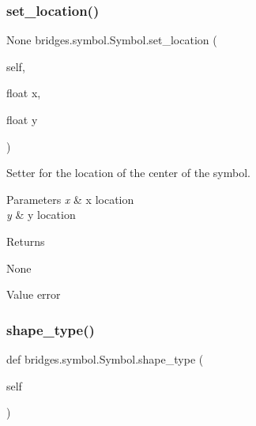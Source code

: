 \mbox{\label{classbridges_1_1symbol_1_1_symbol_a353bd462db1773ebe1e9a888f91d6ea5}} 
\subsubsection{\texorpdfstring{set\_location()}{set\_location()}}
{\footnotesize\ttfamily  None bridges.\+symbol.\+Symbol.\+set\+\_\+location (\begin{DoxyParamCaption}\item[{}]{self,  }\item[{float}]{x,  }\item[{float}]{y }\end{DoxyParamCaption})}



Setter for the location of the center of the symbol. 


\begin{DoxyParams}{Parameters}
{\em x} & x location \\
\hline
{\em y} & y location \\
\hline
\end{DoxyParams}
\begin{DoxyReturn}{Returns}


None \begin{DoxyVerb}       Value error
\end{DoxyVerb}
 
\end{DoxyReturn}
\mbox{\label{classbridges_1_1symbol_1_1_symbol_a86813f0f1a7ecbe5c52725730c887e75}} 
\subsubsection{\texorpdfstring{shape\_type()}{shape\_type()}\hspace{0.1cm}{\footnotesize\ttfamily [1/2]}}
{\footnotesize\ttfamily def bridges.\+symbol.\+Symbol.\+shape\+\_\+type (\begin{DoxyParamCaption}\item[{}]{self }\end{DoxyParamCaption})}

